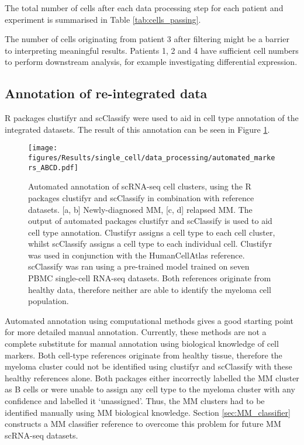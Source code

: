 The total number of cells after each data processing step for each patient and experiment is summarised in Table \ref{tab:cells_passing}.

The number of cells originating from patient 3 after filtering might be a barrier to interpreting meaningful results.
Patients 1, 2 and 4 have sufficient cell numbers to perform downstream analysis, for example investigating differential expression.

\subsection{Annotation of re-integrated data}\label{subsec:sc_annotate}
R packages clustifyr and scClassify were used to aid in cell type annotation of the integrated datasets.
The result of this annotation can be seen in Figure \ref{fig:annotation_automated}.
\begin{figure}[htb]
    \centering
    \texttt{[image: figures/Results/single\_cell/data\_processing/automated\_markers\_ABCD.pdf]}
    \caption[Automated annotation of scRNA-seq data]{Automated annotation of scRNA-seq cell clusters, using the R packages clustifyr and scClassify in combination with reference datasets.
    [a, b] Newly-diagnosed MM, [c, d] relapsed MM.
    The output of automated packages clustifyr and scClassify is used to aid cell type annotation.
    Clustifyr assigns a cell type to each cell cluster, whilst scClassify assigns a cell type to each individual cell.
    Clustifyr was used in conjunction with the HumanCellAtlas reference.
    scClassify was ran using a pre-trained model trained on seven PBMC single-cell RNA-seq datasets.
    Both references originate from healthy data, therefore neither are able to identify the myeloma cell population.}
    \label{fig:annotation_automated}
\end{figure}

Automated annotation using computational methods gives a good starting point for more detailed manual annotation.
Currently, these methods are not a complete substitute for manual annotation using biological knowledge of cell markers.
Both cell-type references originate from healthy tissue, therefore the myeloma cluster could not be identified using clustifyr and scClassify with these healthy references alone.
Both packages either incorrectly labelled the MM cluster as B cells or were unable to assign any cell type to the myeloma cluster with any confidence and labelled it `unassigned'.
Thus, the MM clusters had to be identified manually using MM biological knowledge.
Section \ref{sec:MM_classifier} constructs a MM classifier reference to overcome this problem for future MM scRNA-seq datasets.

